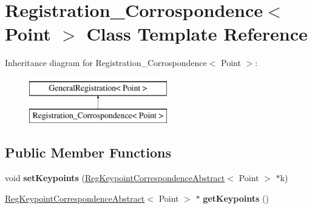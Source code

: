 \hypertarget{classRegistration__Corrospondence}{
\section{Registration\_\-Corrospondence$<$ Point $>$ Class Template Reference}
\label{classRegistration__Corrospondence}
}
Inheritance diagram for Registration\_\-Corrospondence$<$ Point $>$:\begin{figure}[H]
\begin{center}
\leavevmode
\includegraphics[height=2.000000cm]{classRegistration__Corrospondence}
\end{center}
\end{figure}
\subsection*{Public Member Functions}
\begin{DoxyCompactItemize}
\item 
\hypertarget{classRegistration__Corrospondence_ac23793781bc288e7d3255fe3fad21d95}{
void {\bfseries setKeypoints} (\hyperlink{classRegKeypointCorrespondenceAbstract}{RegKeypointCorrespondenceAbstract}$<$ Point $>$ $\ast$k)}
\label{classRegistration__Corrospondence_ac23793781bc288e7d3255fe3fad21d95}

\item 
\hypertarget{classRegistration__Corrospondence_aae93bc641218d3ffa81985b60a995c8b}{
\hyperlink{classRegKeypointCorrespondenceAbstract}{RegKeypointCorrespondenceAbstract}$<$ Point $>$ $\ast$ {\bfseries getKeypoints} ()}
\label{classRegistration__Corrospondence_aae93bc641218d3ffa81985b60a995c8b}

\end{DoxyCompactItemize}

